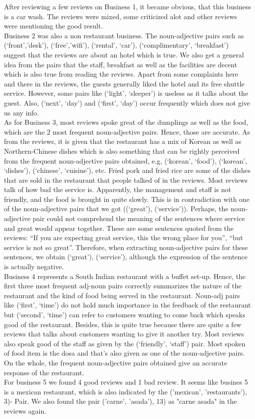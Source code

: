 After reviewing a few reviews on Business 1, it became obvious, that this business is a car wash. The reviews were mixed, some criticized alot and other reviews were mentioning the good result. \\
Business 2 was also a non restaurant business. The noun-adjective pairs such as (‘front’,’desk’), (‘free’,’wifi’), (‘rental’, ‘car’), (‘complimentary’, ‘breakfast’) suggest that the reviews are about an hotel which is true. We also get a general idea from the pairs that the staff, breakfast as well as the facilities are decent which is also true from reading the reviews. Apart from some complaints here and there in the reviews, the guests generally liked the hotel and its free shuttle service. However, some pairs like (‘light’, ‘sleeper’) is useless as it talks about the guest. Also, (‘next’, ‘day’) and (‘first’, ‘day’) occur frequently which does not give us any info.\\
As for Business 3, most reviews spoke great of the dumplings as well as the food, which are the 2 most frequent noun-adjective pairs. Hence, those are accurate. As from the reviews, it is given that the restaurant has a mix of Korean as well as Northern-Chinese dishes which is also something that can be rightly perceived from the frequent noun-adjective pairs obtained, e.g, (‘korean’, ‘food’), (‘korean’, ‘dishes’), (‘chinese’, ‘cuisine’), etc. Fried pork and fried rice are some of the dishes that are sold in the restaurant that people talked of in the reviews. Most reviews talk of how bad the service is. Apparently, the management and staff is not friendly, and the food is brought in quite slowly. This is in contradiction with one of the noun-adjective pairs that we got ((‘great’), (‘service’)).  Perhaps, the noun-adjective pair could not comprehend the meaning of the sentences where service and great would appear together. These are some sentences quoted from the reviews: “If you are expecting great service, this the wrong place for you”, “but service is not so great”.  Therefore, when extracting noun-adjective pairs for these sentences, we obtain (‘great’), (‘service’), although the expression of the sentence is actually negative.\\
Business 4 represents a South Indian restaurant with a buffet set-up. Hence, the first three most frequent adj-noun pairs correctly summarizes the nature of the restaurant and the kind of food being served in the restaurant. Noun-adj pairs like (‘first’, ‘time’) do not hold much importance in the feedback of the restaurant but (‘second’, ‘time’) can refer to customers wanting to come back which speaks good of the restaurant. Besides, this is quite true because there are quite a few reviews that talks about customers wanting to give it another try. Most reviews also speak good of the staff as given by the (‘friendly’, ‘staff’) pair. Most spoken of food item is the dosa and that’s also given as one of the noun-adjective pairs. On the whole, the frequent noun-adjective pairs obtained give an accurate response of the restaurant.\\
For business 5 we found 4 good reviews and 1 bad review. It seems like busines 5 is a mexican restaurant, which is also indicated by the ('mexican', 'restaurants'), 3)- Pair. We also found the pair ('carne', 'asada'), 13) as "carne asada" in the reviews again.\\